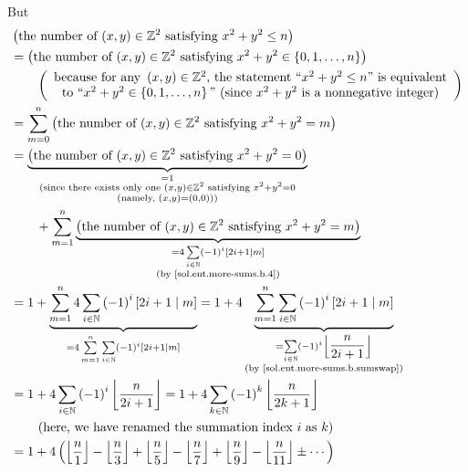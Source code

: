 \documentclass[paper=a4, fontsize=12pt]{scrartcl}%
\let\sumnonlimits\sum
\renewcommand{\sum}{\sumnonlimits\limits}
\theoremstyle{plainsl}
\theoremstyle{definition}
\theoremstyle{remark}
\begin{document}
But
\begin{align*}
&  \left(  \text{the number of $\left(  x,y\right)  \in\mathbb{Z}^{2}$
satisfying $x^{2}+y^{2}\leq n$}\right) \\
&  =\left(  \text{the number of $\left(  x,y\right)  \in\mathbb{Z}^{2}$
satisfying $x^{2}+y^{2}\in\left\{  0,1,\ldots,n\right\}  $}\right) \\
&  \qquad\left(
\begin{array}
[c]{c}%
\text{because for any }\left(  x,y\right)  \in\mathbb{Z}^{2}\text{, the
statement \textquotedblleft}x^{2}+y^{2}\leq n\text{\textquotedblright\ is
equivalent}\\
\text{to \textquotedblleft}x^{2}+y^{2}\in\left\{  0,1,\ldots
,n\right\}  \text{\textquotedblright\ (since }x^{2}+y^{2}\text{ is a
nonnegative integer)}%
\end{array}
\right) \\
&  =\sum_{m=0}^{n}\left(  \text{the number of $\left(  x,y\right)
\in\mathbb{Z}^{2}$ satisfying $x^{2}+y^{2}=m$}\right) \\
&  =\underbrace{\left(  \text{the number of $\left(  x,y\right)  \in
\mathbb{Z}^{2}$ satisfying $x^{2}+y^{2}=0$}\right)  }%
_{\substack{=1\\\text{(since there exists only one }\left(  x,y\right)
\in\mathbb{Z}^{2}\text{ satisfying }x^{2}+y^{2}=0\\\text{(namely, }\left(
x,y\right)  =\left(  0,0\right)  \text{))}}}\\
&  \qquad+\sum_{m=1}^{n}\underbrace{\left(  \text{the number of $\left(
x,y\right)  \in\mathbb{Z}^{2}$ satisfying $x^{2}+y^{2}=m$}\right)
}_{\substack{=4\sum_{i\in\mathbb{N}}\left(  -1\right)  ^{i}\left[  2i+1\mid
m\right]  \\\text{(by \eqref{sol.ent.more-sums.b.4})}}}\\
&  =1+\underbrace{\sum_{m=1}^{n}4\sum_{i\in\mathbb{N}}\left(  -1\right)
^{i}\left[  2i+1\mid m\right]  }_{=4\sum_{m=1}^{n}\sum_{i\in\mathbb{N}}\left(
-1\right)  ^{i}\left[  2i+1\mid m\right]  }=1+4\underbrace{\sum_{m=1}^{n}%
\sum_{i\in\mathbb{N}}\left(  -1\right)  ^{i}\left[  2i+1\mid m\right]
}_{\substack{=\sum_{i\in\mathbb{N}}\left(  -1\right)  ^{i}\left\lfloor
\dfrac{n}{2i+1}\right\rfloor \\\text{(by \eqref{sol.ent.more-sums.b.sumswap})}%
}}\\
&  =1+4\sum_{i\in\mathbb{N}}\left(  -1\right)  ^{i}\left\lfloor \dfrac
{n}{2i+1}\right\rfloor =1+4\sum_{k\in\mathbb{N}}\left(  -1\right)
^{k}\left\lfloor \dfrac{n}{2k+1}\right\rfloor \\
&  \qquad\left(  \text{here, we have renamed the summation index }i\text{ as
}k\right) \\
&  =1+4\left(  \left\lfloor \dfrac{n}{1}\right\rfloor -\left\lfloor \dfrac
{n}{3}\right\rfloor +\left\lfloor \dfrac{n}{5}\right\rfloor -\left\lfloor
\dfrac{n}{7}\right\rfloor +\left\lfloor \dfrac{n}{9}\right\rfloor
-\left\lfloor \dfrac{n}{11}\right\rfloor \pm\cdots\right)
\end{align*}
\end{document}
